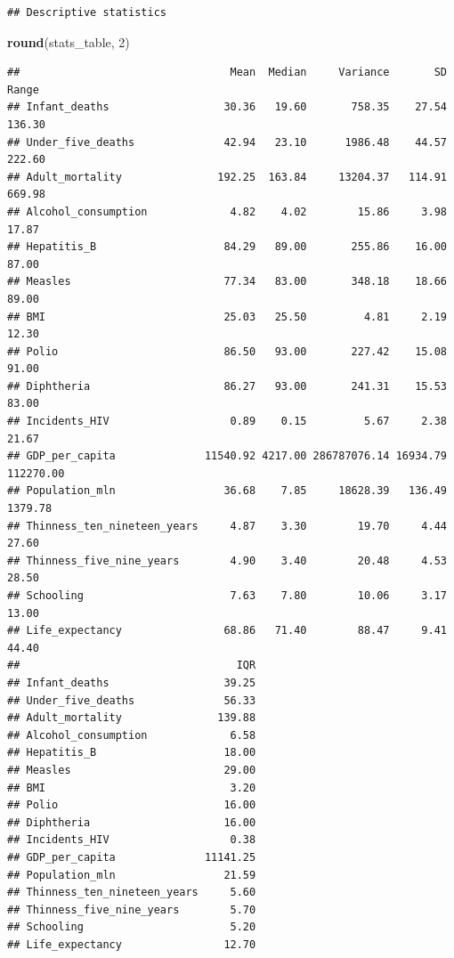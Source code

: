 \documentclass[
  10pt,
]{article}
\newenvironment{Shaded}{\begin{snugshade}}{\end{snugshade}}
\newcommand{\DecValTok}[1]{\textcolor[rgb]{0.00,0.00,0.81}{#1}}
\newcommand{\FunctionTok}[1]{\textcolor[rgb]{0.13,0.29,0.53}{\textbf{#1}}}
\newcommand{\NormalTok}[1]{#1}
\begin{document}
\begin{verbatim}
## Descriptive statistics
\end{verbatim}

\begin{Shaded}
\begin{Highlighting}[]
\FunctionTok{round}\NormalTok{(stats\_table, }\DecValTok{2}\NormalTok{)}
\end{Highlighting}
\end{Shaded}

\begin{verbatim}
##                                 Mean  Median     Variance       SD     Range
## Infant_deaths                  30.36   19.60       758.35    27.54    136.30
## Under_five_deaths              42.94   23.10      1986.48    44.57    222.60
## Adult_mortality               192.25  163.84     13204.37   114.91    669.98
## Alcohol_consumption             4.82    4.02        15.86     3.98     17.87
## Hepatitis_B                    84.29   89.00       255.86    16.00     87.00
## Measles                        77.34   83.00       348.18    18.66     89.00
## BMI                            25.03   25.50         4.81     2.19     12.30
## Polio                          86.50   93.00       227.42    15.08     91.00
## Diphtheria                     86.27   93.00       241.31    15.53     83.00
## Incidents_HIV                   0.89    0.15         5.67     2.38     21.67
## GDP_per_capita              11540.92 4217.00 286787076.14 16934.79 112270.00
## Population_mln                 36.68    7.85     18628.39   136.49   1379.78
## Thinness_ten_nineteen_years     4.87    3.30        19.70     4.44     27.60
## Thinness_five_nine_years        4.90    3.40        20.48     4.53     28.50
## Schooling                       7.63    7.80        10.06     3.17     13.00
## Life_expectancy                68.86   71.40        88.47     9.41     44.40
##                                  IQR
## Infant_deaths                  39.25
## Under_five_deaths              56.33
## Adult_mortality               139.88
## Alcohol_consumption             6.58
## Hepatitis_B                    18.00
## Measles                        29.00
## BMI                             3.20
## Polio                          16.00
## Diphtheria                     16.00
## Incidents_HIV                   0.38
## GDP_per_capita              11141.25
## Population_mln                 21.59
## Thinness_ten_nineteen_years     5.60
## Thinness_five_nine_years        5.70
## Schooling                       5.20
## Life_expectancy                12.70
\end{verbatim}
\end{document}
